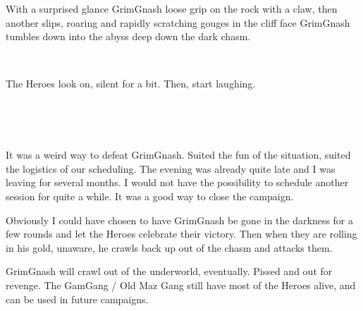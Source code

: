 With a surprised glance GrimGnash loose grip on the rock with a claw, then another slips, roaring and rapidly scratching gouges in the cliff face GrimGnash tumbles down into the abyss deep down the dark chasm.

\

The Heroes look on, silent for a bit. Then, start laughing. 

\

\


\begin{samepage}
\begin{readoutloud}
It was a weird way to defeat GrimGnash. Suited the fun of the situation, suited the logistics of our scheduling. The evening was already quite late and I was leaving for several months. I would not have the possibility to schedule another session for quite a while. It was a good way to close the campaign.

Obviously I could have chosen to have GrimGnash be gone in the darkness for a few rounds and let the Heroes celebrate their victory. Then when they are rolling in his gold, unaware, he crawls back up out of the chasm and attacks them.
\end{readoutloud}
\end{samepage}


\begin{samepage}
\begin{readoutloud}
GrimGnash will crawl out of the underworld, eventually. Pissed and out for revenge. The GamGang / Old Maz Gang still have most of the Heroes alive, and can be used in future campaigns.
\end{readoutloud}
\end{samepage}






























\clearpage
\raggedbottom
